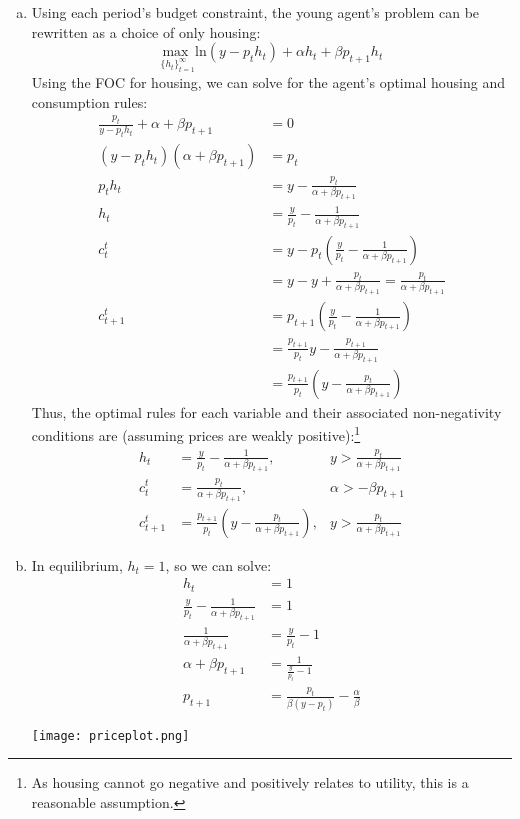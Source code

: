 \documentclass{article}
\newcommand{\loge}[1]{\text{ln}\left(#1\right)}
\newcommand{\usmax}[1]{\underset{#1}{\text{max }}}
\begin{document}
\begin{enumerate}
\begin{enumerate}[(a)]
			\item Using each period's budget constraint, the young agent's problem can be rewritten as a choice of only housing:
				\[
					\usmax{\{h_t\}^\infty_{t=1}}\loge{y-p_th_t} + \alpha h_t + \beta p_{t+1}h_t
				\]
				Using the FOC for housing, we can solve for the agent's optimal housing and consumption rules:
				\begin{align*}
					\frac{p_t}{y-p_th_t} + \alpha + \beta p_{t+1} &= 0				\\
					(y-p_th_t)(\alpha + \beta p_{t+1}) &= p_t 						\\
					p_th_t &= y-\frac{p_t}{\alpha + \beta p_{t+1}}					\\
					h_t		&= \frac{y}{p_t} - \frac{1}{\alpha + \beta p_{t+1}} 	\\
					c_t^t &= y-p_t\left(\frac{y}{p_t} - \frac{1}{\alpha + \beta p_{t+1}}\right) \\
						&= y - y + \frac{p_t}{\alpha + \beta p_{t+1}} = \frac{p_t}{\alpha + \beta p_{t+1}} \\
					c_{t+1}^t &= p_{t+1}\left(\frac{y}{p_t} - \frac{1}{\alpha + \beta p_{t+1}}\right) \\
						&= \frac{p_{t+1}}{p_t} y - \frac{p_{t+1}}{\alpha + \beta p_{t+1}}	\\
						&=  \frac{p_{t+1}}{p_t} \left( y - \frac{p_t}{\alpha + \beta p_{t+1}} \right)
				\end{align*}
				Thus, the optimal rules for each variable and their associated non-negativity conditions are (assuming prices are weakly positive):\footnote{As housing cannot go negative and positively relates to utility, this is a reasonable assumption.}
				\begin{align*}
					h_t		&= \frac{y}{p_t} - \frac{1}{\alpha + \beta p_{t+1}}, &y>\frac{p_t}{\alpha + \beta p_{t+1}} 	\\
					c_t^t &= \frac{p_t}{\alpha + \beta p_{t+1}}, &\alpha>-\beta p_{t+1} \\
					c_{t+1}^t &=  \frac{p_{t+1}}{p_t} \left( y - \frac{p_t}{\alpha + \beta p_{t+1}} \right), &y>\frac{p_t}{\alpha + \beta p_{t+1}}
				\end{align*}
				
			\item In equilibrium, $h_t=1$, so we can solve:
				\begin{align*}
					h_t		&= 1	\\
					\frac{y}{p_t} - \frac{1}{\alpha + \beta p_{t+1}} &= 1 	\\
					\frac{1}{\alpha + \beta p_{t+1}} &= \frac{y}{p_t} - 1  	\\
					\alpha + \beta p_{t+1} &= \frac{1}{\frac{y}{p_t} - 1}	\\
					p_{t+1} &= \frac{p_t}{\beta(y-p_t)} - \frac{\alpha}{\beta}
				\end{align*}
				\begin{center}
					\texttt{[image: priceplot.png]}
				\end{center}
				

\end{enumerate}
\end{enumerate}
\end{document}

